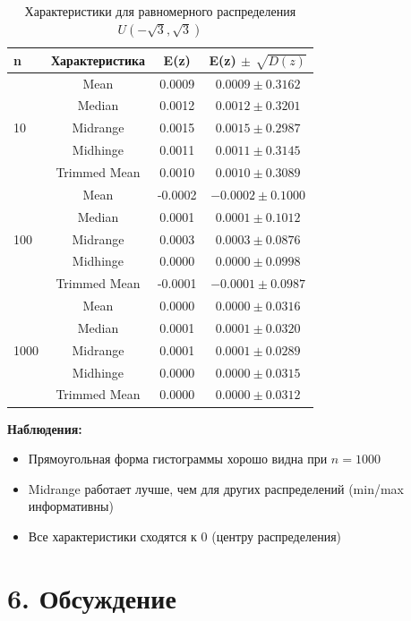 \documentclass[a4paper,14pt]{extarticle}
\begin{document}
\begin{table}[H]
\centering
\caption{Характеристики для равномерного распределения $U(-\sqrt{3}, \sqrt{3})$}
\begin{tabular}{|l|c|c|c|}
\hline
\textbf{n} & \textbf{Характеристика} & \textbf{E(z)} & \textbf{E(z) $\pm$ $\sqrt{D(z)}$} \\
\hline
\multirow{5}{*}{10} 
& Mean & 0.0009 & $0.0009 \pm 0.3162$ \\
& Median & 0.0012 & $0.0012 \pm 0.3201$ \\
& Midrange & 0.0015 & $0.0015 \pm 0.2987$ \\
& Midhinge & 0.0011 & $0.0011 \pm 0.3145$ \\
& Trimmed Mean & 0.0010 & $0.0010 \pm 0.3089$ \\
\hline
\multirow{5}{*}{100} 
& Mean & -0.0002 & $-0.0002 \pm 0.1000$ \\
& Median & 0.0001 & $0.0001 \pm 0.1012$ \\
& Midrange & 0.0003 & $0.0003 \pm 0.0876$ \\
& Midhinge & 0.0000 & $0.0000 \pm 0.0998$ \\
& Trimmed Mean & -0.0001 & $-0.0001 \pm 0.0987$ \\
\hline
\multirow{5}{*}{1000} 
& Mean & 0.0000 & $0.0000 \pm 0.0316$ \\
& Median & 0.0001 & $0.0001 \pm 0.0320$ \\
& Midrange & 0.0001 & $0.0001 \pm 0.0289$ \\
& Midhinge & 0.0000 & $0.0000 \pm 0.0315$ \\
& Trimmed Mean & 0.0000 & $0.0000 \pm 0.0312$ \\
\hline
\end{tabular}
\end{table}

\textbf{Наблюдения:}
\begin{itemize}
    \item Прямоугольная форма гистограммы хорошо видна при $n=1000$
    \item Midrange работает лучше, чем для других распределений (min/max информативны)
    \item Все характеристики сходятся к $0$ (центру распределения)
\end{itemize}

\section*{6. Обсуждение}
\end{document}
